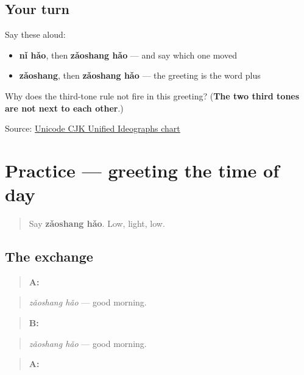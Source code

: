 \subsection*{Your turn}
Say these aloud:

\begin{itemize}
\raggedright
  \item \textbf{nǐ hǎo}, then \textbf{zǎoshang hǎo} — and say which one moved
  \item \textbf{zǎoshang}, then \textbf{zǎoshang hǎo} — the greeting is the word plus 
\end{itemize}

\begin{tcolorbox}[breakable,colback=teal!4,colframe=teal!35!black,title={Before you move on}]
Why does the third-tone rule not fire in this greeting? (\textbf{The two third tones are not next to each other}.)

Source: \href{https://www.unicode.org/charts/PDF/U4E00.pdf}{Unicode CJK Unified Ideographs chart}
\end{tcolorbox}
\section[Practice]{Practice — greeting the time of day}

\label{lesson:ZH-C07-practice}



\begin{quote}
Say \textbf{zǎoshang hǎo}. Low, light, low.
\end{quote}

\subsection*{The exchange}
\begin{quote}
\textbf{A:} 
\end{quote}

\begin{quote}
\emph{zǎoshang hǎo} — good morning.
\end{quote}

\begin{quote}
\textbf{B:} 
\end{quote}

\begin{quote}
\emph{zǎoshang hǎo} — good morning.
\end{quote}

\begin{quote}
\textbf{A:} 
\end{quote}

